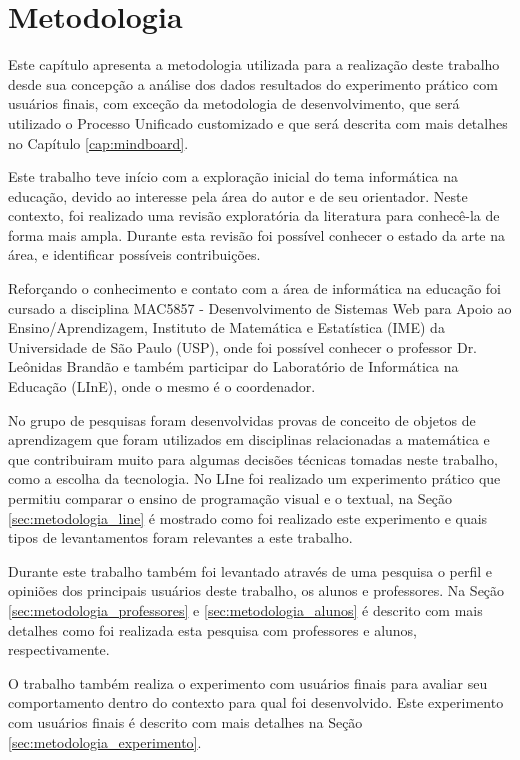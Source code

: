 \chapter{Metodologia}

Este capítulo apresenta a metodologia utilizada para a realização deste trabalho desde sua concepção a análise dos dados resultados do experimento prático com usuários finais, com exceção da  metodologia de desenvolvimento, que será utilizado o Processo Unificado customizado e que será descrita com mais detalhes no Capítulo \ref{cap:mindboard}. 

Este trabalho teve início com a exploração inicial do tema informática na educação, devido ao interesse pela área do autor e de seu orientador. Neste contexto, foi realizado uma revisão exploratória da literatura para conhecê-la de forma mais ampla. Durante esta revisão foi possível conhecer o estado da arte na área, e identificar possíveis contribuições.

Reforçando o conhecimento e contato com a área de informática na educação foi cursado a disciplina MAC5857 - Desenvolvimento de Sistemas Web para Apoio ao Ensino/Aprendizagem, Instituto de Matemática e Estatística (IME) da Universidade de São Paulo (USP), onde foi possível conhecer o professor Dr. Leônidas Brandão e também participar do Laboratório de Informática na Educação (LInE), onde o mesmo é o coordenador.

No grupo de pesquisas foram desenvolvidas provas de conceito de objetos de aprendizagem que foram utilizados em disciplinas relacionadas a matemática e que contribuiram muito para algumas decisões técnicas tomadas neste trabalho, como a escolha da tecnologia. No LIne foi realizado um experimento prático que permitiu comparar o ensino de programação visual e o textual, na Seção \ref{sec:metodologia_line} é mostrado como foi realizado este experimento e quais tipos de levantamentos foram relevantes a este trabalho.

Durante este trabalho também foi levantado através de uma pesquisa o perfil e opiniões dos principais usuários deste trabalho, os alunos e professores. Na Seção \ref{sec:metodologia_professores} e \ref{sec:metodologia_alunos} é descrito com mais detalhes como foi realizada esta pesquisa com professores e alunos, respectivamente.

O trabalho também realiza o experimento com usuários finais para avaliar seu comportamento dentro do contexto para qual foi desenvolvido. Este experimento com usuários finais é descrito com mais detalhes na Seção \ref{sec:metodologia_experimento}.

